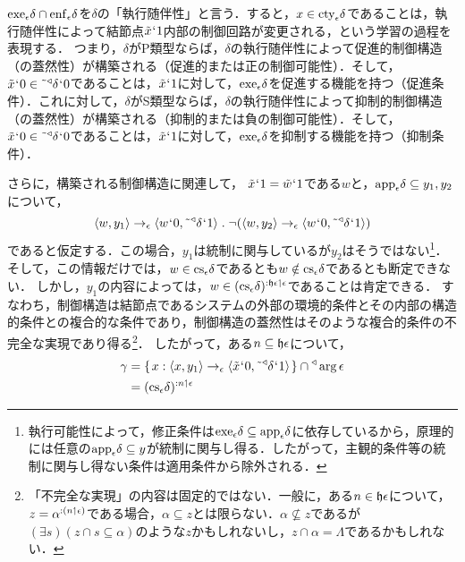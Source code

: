 \noindent $ \mathrm{exe}_{\epsilon}\delta\cap\mathrm{enf}_{\epsilon}\delta $を$ \delta $の「執行随伴性」と言う．すると，$x\in\mathrm{cty}_{\epsilon}\delta$であることは，執行随伴性によって結節点$\tilde{x}{\mspace{1mu}{`}\mspace{1mu}} 1$内部の制御回路が変更される，という学習の過程を表現する．
つまり，$\delta$がP類型ならば，$\delta$の執行随伴性によって促進的制御構造（の蓋然性）が構築される（促進的または正の制御可能性）．そして，$\tilde{x}{\mspace{1mu}{`}\mspace{1mu}} 0\in\tilde{\:\:}{^\triangleleft}\delta{\mspace{1mu}{`}\mspace{1mu}} 0$であることは，$\tilde{x}{\mspace{1mu}{`}\mspace{1mu}} 1$に対して，$\mathrm{exe}_{\epsilon}\delta$を促進する機能を持つ（促進条件）．これに対して，$\delta$がS類型ならば，$\delta$の執行随伴性によって抑制的制御構造（の蓋然性）が構築される（抑制的または負の制御可能性）．そして，$\tilde{x}{\mspace{1mu}{`}\mspace{1mu}} 0\in\tilde{\:\:}{^\triangleleft}\delta{\mspace{1mu}{`}\mspace{1mu}} 0$であることは，$\tilde{x}{\mspace{1mu}{`}\mspace{1mu}} 1$に対して，$\mathrm{exe}_{\epsilon}\delta$を抑制する機能を持つ（抑制条件）．

さらに，構築される制御構造に関連して，
$ \tilde{x}{\mspace{1mu}{`}\mspace{1mu}} 1 = \tilde{w}{\mspace{1mu}{`}\mspace{1mu}} 1 $である$w$と，$ \mathrm{app}_{\epsilon}\delta\subseteq y_1,y_2 $について，
\[
    \orp{w,y_1}\to_{\epsilon}\orp{w\fap 0,\tildel{\trgl{\delta}}\fap 1}\con{1}\neg(\orp{w,y_2}\to_{\epsilon}\orp{w\fap 0,\tildel{\trgl{\delta}}\fap 1})
\]
であると仮定する．この場合，$y_1$は統制に関与しているが$y_2$はそうではない\footnote{
    執行可能性によって，修正条件は$ \mathrm{exe}_{\epsilon}\delta\subseteq\mathrm{app}_{\epsilon}\delta $に依存しているから，原理的には任意の$ \mathrm{app}_{\epsilon}\delta\subseteq y $が統制に関与し得る．したがって，主観的条件等の統制に関与し得ない条件は適用条件から除外される．}．
そして，この情報だけでは，$ w\in\mathrm{cs}_{\epsilon}\delta $であるとも$ w\notin\mathrm{cs}_{\epsilon}\delta $であるとも断定できない．
しかし，$ y_1 $の内容によっては，$ w\in (\mathrm{cs}_{\epsilon}\delta)^{:\mathfrak{h}\epsilon\mathbin{\upharpoonleft}\epsilon} $であることは肯定できる．
すなわち，制御構造は結節点であるシステムの外部の環境的条件とその内部の構造的条件との複合的な条件であり，制御構造の蓋然性はそのような複合的条件の不完全な実現であり得る\footnote{
    「不完全な実現」の内容は固定的ではない．一般に，ある$n\in\mathfrak{h}\epsilon$について，$ z = \alpha^{:(n\mathbin{\upharpoonleft}\epsilon)} $である場合，$\alpha\subseteq z$とは限らない．$\alpha\nsubseteq z$であるが$(\exists s)(z\cap s\subseteq\alpha)$のような$z$かもしれないし，$ z\cap\alpha = \Lambda $であるかもしれない．
}．
したがって，ある$n\subseteq\mathfrak{h}\epsilon$について，
\begin{align*}
    \gamma & = \{\mspace{2mu}x:\langle x,y_1 \rangle\to_{\epsilon}\langle \tilde{x}{\mspace{1mu}{`}\mspace{1mu}} 0,\tilde{\:\:}{^\triangleleft}\delta{\mspace{1mu}{`}\mspace{1mu}} 1 \rangle\mspace{2mu}\}\cap{^\triangleleft}\arg\epsilon\\ & = (\mathrm{cs}_{\epsilon}\delta)^{:n\mathbin{\upharpoonleft}\epsilon}
\end{align*}
